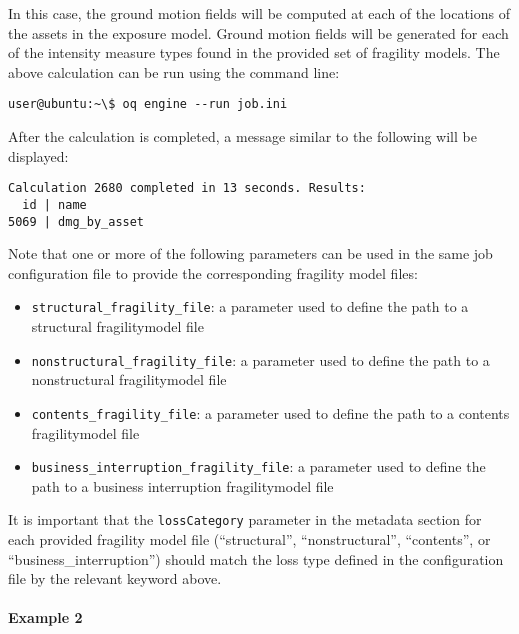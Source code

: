 In this case, the ground motion fields will be computed at each of the
locations of the assets in the exposure model. Ground motion fields will be
generated for each of the intensity measure types found in the provided set of
fragility models. The above calculation can be run using the command line:

\begin{verbatim}
user@ubuntu:~\$ oq engine --run job.ini
\end{verbatim}

After the calculation is completed, a message similar to the following will be
displayed:

\begin{verbatim}
Calculation 2680 completed in 13 seconds. Results:
  id | name
5069 | dmg_by_asset
\end{verbatim}

Note that one or more of the following parameters can be used in the same job
configuration file to provide the corresponding fragility model files:

\begin{itemize}

  \item \Verb+structural_fragility_file+: a parameter used to define the path
    to a structural \gls{fragilitymodel} file

  \item \Verb+nonstructural_fragility_file+: a parameter used to define the path
    to a nonstructural \gls{fragilitymodel} file

  \item \Verb+contents_fragility_file+: a parameter used to define the path
    to a contents \gls{fragilitymodel} file

  \item \Verb+business_interruption_fragility_file+: a parameter used to define
    the path to a business interruption \gls{fragilitymodel} file

\end{itemize}

It is important that the \Verb+lossCategory+ parameter in the metadata section
for each provided fragility model file (``structural'', ``nonstructural'',
``contents'', or ``business\_interruption'') should match the loss type
defined in the configuration file by the relevant keyword above.


\paragraph{Example 2}


